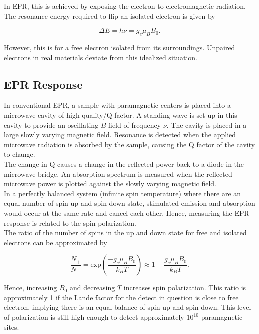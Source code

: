 \documentclass[svgnames]{article}
\begin{document}
In EPR, this is achieved by exposing the electron to electromagnetic radiation.
The resonance energy required to flip an isolated electron is given by 

 \[
\Delta E = h\nu = g_e \mu_B B_0.
\] \vspace{3px}

However, this is for a free electron isolated from its surroundings. Unpaired
electrons in real materials deviate from this idealized situation. 

\subsection{EPR Response} 

In conventional EPR, a sample with paramagnetic centers is placed into a
microwave cavity of high quality/Q factor. A standing wave is set up in this
cavity to provide an oscillating $B$ field of frequency $\nu$. The cavity is
placed in a large slowly varying magnetic field. Resonance is detected when the
applied microwave radiation is absorbed by the sample, causing the Q factor of
the cavity to change. \\

The change in Q causes a change in the reflected power back to a diode in the
microwave bridge. An absorption spectrum is measured when the reflected
microwave power is plotted against the slowly varying magnetic field. \\

In a perfectly balanced system (infinite spin temperature) where there are an
equal number of spin up and spin down state, stimulated emission and absorption
would occur at the same rate and cancel each other. Hence, measuring the EPR
response is related to the spin polarization.  \\

The ratio of the number of spins in the up and down state for free and isolated
electrons can be approximated by 

\[
    \frac{N_+}{N_-} = \text{exp} \left( \frac{-g_e \mu_B B_0}{k_B T} \right)
    \approx 1 - \frac{g_e \mu_B B_0}{k_B T}. 
\] \vspace{3px}

Hence, increasing $B_0$ and decreasing $T$ increases spin polarization. This
ratio is approximately 1 if the Lande factor for the detect in question is
close to free electron, implying there is an equal balance of spin up and spin
down. This level of polarization is still high enough to detect approximately
$10^10$ paramagnetic sites. 
\end{document}
